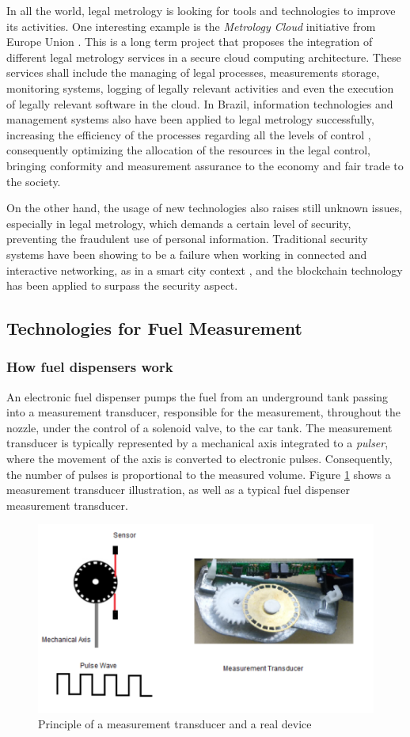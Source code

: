 \documentclass[sigplan]{acmart}
\begin{document}
In all the world, legal metrology is looking for tools and technologies to improve its activities.
One interesting example is the \emph{Metrology Cloud} initiative from Europe Union \cite{Oppermann2018}.
This is a long term project that proposes the integration of different legal metrology services in a secure cloud computing architecture.
These services shall include the managing of legal processes, measurements storage, monitoring systems, logging of legally relevant activities and even the execution of legally relevant software in the cloud.
In Brazil, information technologies and management systems also have been applied to legal metrology successfully, increasing the efficiency of the processes regarding all the levels of control \cite{RodriguesFilho2015a}, consequently optimizing the allocation of the resources in the legal control, bringing conformity and measurement assurance to the economy and fair trade to the society.

On the other hand, the usage of new technologies also raises still unknown issues, especially in legal metrology, which demands a certain level of security, preventing the fraudulent use of personal information. 
Traditional security systems have been showing to be a failure when working in connected and interactive networking, as in a smart city context \cite{Biswas2016}, and the blockchain technology has been applied to surpass the security aspect.

\subsection{Technologies for Fuel Measurement}
\subsubsection{How fuel dispensers work}
An electronic fuel dispenser pumps the fuel from an underground tank passing into a measurement transducer, responsible for the measurement, throughout the nozzle, under the control of a solenoid valve, to the car tank.
The measurement transducer is typically represented by a mechanical axis integrated to a \textit{pulser}, where the movement of the axis is converted to electronic pulses.
Consequently, the number of pulses is proportional to the measured volume.
Figure \ref{f:transducer} shows a measurement transducer illustration, as well as a typical fuel dispenser measurement transducer.

\begin{figure}[!t]
\centering
\includegraphics[width=.45\textwidth]{transducer}
\caption{Principle of a measurement transducer and a real device}
\label{f:transducer}
\end{figure}
\end{document}

